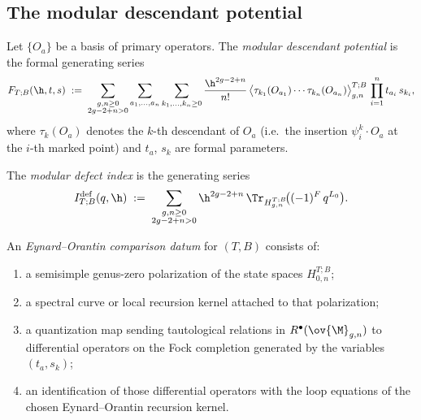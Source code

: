 \subsection{The modular descendant potential}
\label{subsec:modular-descendant-potential}

\begin{definition}
\label{def:modular-descendant-potential}
Let $\{O_a\}$ be a basis of primary operators. The \emph{modular descendant potential}
is the formal generating series
\begin{equation}
\label{eq:modular-descendant-potential}
F_{T;B}(\h,t,s)
\;:=\;
\sum_{\substack{g,n \geq 0 \\ 2g-2+n > 0}}
\sum_{a_1,\dots,a_n}
\sum_{k_1,\dots,k_n \geq 0}
\frac{\h^{2g-2+n}}{n!}\,
\bigl\langle \tau_{k_1}(O_{a_1}) \cdots \tau_{k_n}(O_{a_n})
\bigr\rangle_{g,n}^{T;B}\,
\prod_{i=1}^n t_{a_i}\,s_{k_i},
\end{equation}
where $\tau_k(O_a)$ denotes the $k$-th descendant of $O_a$ (i.e.\ the insertion
$\psi_i^k \cdot O_a$ at the $i$-th marked point) and $t_a$, $s_k$ are formal parameters.
\end{definition}

\begin{definition}
\label{def:modular-defect-index}
The \emph{modular defect index} is the generating series
\begin{equation}
\label{eq:modular-defect-index}
I_{T;B}^{\mathrm{def}}(q,\h)
\;:=\;
\sum_{\substack{g,n \geq 0 \\ 2g-2+n > 0}}
\h^{2g-2+n}\,
\Tr_{H_{g,n}^{T;B}}\!\bigl((-1)^F\,q^{L_0}\bigr).
\end{equation}
\end{definition}

\begin{definition}
\label{def:eo-comparison-datum}
An \emph{Eynard--Orantin comparison datum} for $(T,B)$ consists of:
\begin{enumerate}[leftmargin=2.4em]
\item a semisimple genus-zero polarization of the state spaces $H_{0,n}^{T;B}$;
\item a spectral curve or local recursion kernel attached to that polarization;
\item a quantization map sending tautological relations in $R^\bullet(\ov{\M}_{g,n})$
to differential operators on the Fock completion generated by the variables
$(t_a,s_k)$;
\item an identification of those differential operators with the loop equations of the
chosen Eynard--Orantin recursion kernel.
\end{enumerate}
\end{definition}

